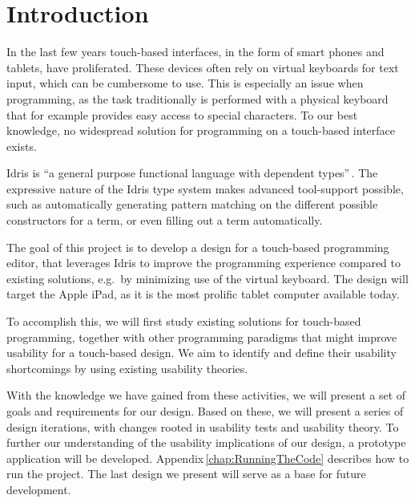 \chapter{Introduction}
\label{sec:Introduction}
In the last few years touch-based interfaces, in the form of smart phones and tablets, have proliferated. These devices often rely on virtual keyboards for text input, which can be cumbersome to use.
This is especially an issue when programming, as the task traditionally is performed with a physical keyboard
that for example provides easy access to special characters.
To our best knowledge, no widespread solution for programming on a touch-based interface exists.

Idris is ``a general purpose functional language with dependent types''\,\cite{brady2013idris}. The expressive nature of the Idris type system makes advanced tool-support possible, such as automatically generating pattern matching on the different possible constructors for a term, or even filling out a term automatically.

The goal of this project is to develop a design for a touch-based programming editor, that leverages Idris to improve the programming experience compared to existing solutions, e.g.\ by minimizing use of the virtual keyboard.
The design will target the Apple iPad, as it is the most prolific tablet computer available today.

To accomplish this, we will first study existing solutions for touch-based programming, together with other programming paradigms that might improve usability for a touch-based design.
We aim to identify and define their usability shortcomings by using existing usability theories.

With the knowledge we have gained from these activities, we will present a set of goals and requirements for our design.
Based on these, we will present a series of design iterations, with changes rooted in usability tests and usability theory.
To further our understanding of the usability implications of our design, a prototype application will be developed.
Appendix\,\ref{chap:RunningTheCode} describes how to run the project.
The last design we present will serve as a base for future development.

